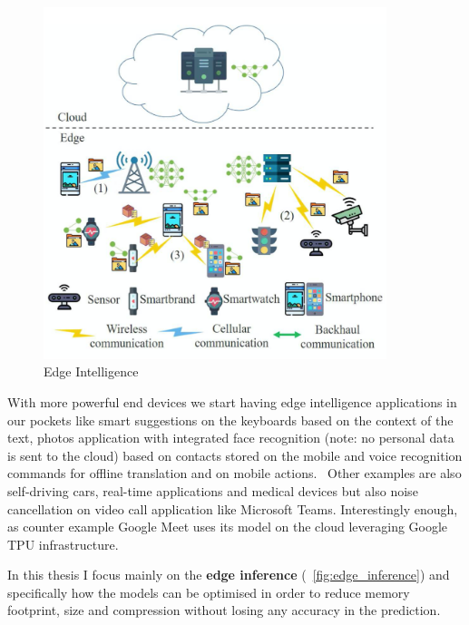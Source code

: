 \begin{figure}[ht]
    \includegraphics[width=10cm]{images/introduction/edge_intelligence.png}
    \centering
    \caption{Edge Intelligence}\label{fig:edge_intelligence}
\end{figure}

With more powerful end devices we start having edge intelligence applications
in our pockets like smart suggestions on the keyboards based on the context of
the text, photos application with integrated face recognition (note: no
personal data is sent to the cloud) based on contacts stored on the mobile and
voice recognition commands for offline translation and on mobile actions.~\cite{xu:2020}
Other examples are also self-driving cars, real-time applications and medical
devices but also noise cancellation on video call application like Microsoft
Teams. Interestingly enough, as counter example Google Meet uses its model on
the cloud leveraging Google TPU infrastructure.

In this thesis I focus mainly on the \textbf{edge inference} (~\ref{fig:edge_inference})
and specifically how the models can be optimised in order to reduce memory
footprint, size and compression without losing any accuracy in the prediction.

